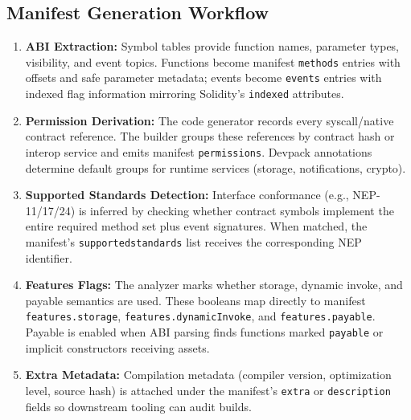 \documentclass[11pt]{article}
\begin{document}
\subsection{Manifest Generation Workflow}
\begin{enumerate}
    \item \textbf{ABI Extraction:} Symbol tables provide function names, parameter types, visibility, and event topics. Functions become manifest \texttt{methods} entries with offsets and safe parameter metadata; events become \texttt{events} entries with indexed flag information mirroring Solidity's \texttt{indexed} attributes.
    \item \textbf{Permission Derivation:} The code generator records every syscall/native contract reference. The builder groups these references by contract hash or interop service and emits manifest \texttt{permissions}. Devpack annotations determine default groups for runtime services (storage, notifications, crypto).
    \item \textbf{Supported Standards Detection:} Interface conformance (e.g., NEP-11/17/24) is inferred by checking whether contract symbols implement the entire required method set plus event signatures. When matched, the manifest's \texttt{supportedstandards} list receives the corresponding NEP identifier.
    \item \textbf{Features Flags:} The analyzer marks whether storage, dynamic invoke, and payable semantics are used. These booleans map directly to manifest \texttt{features.storage}, \texttt{features.dynamicInvoke}, and \texttt{features.payable}. Payable is enabled when ABI parsing finds functions marked \texttt{payable} or implicit constructors receiving assets.
    \item \textbf{Extra Metadata:} Compilation metadata (compiler version, optimization level, source hash) is attached under the manifest's \texttt{extra} or \texttt{description} fields so downstream tooling can audit builds.
\end{enumerate}
\end{document}
